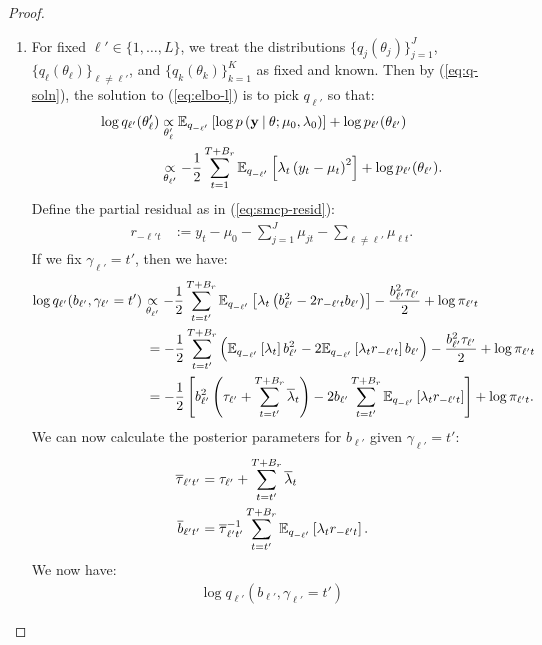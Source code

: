 \begin{proof}
\begin{enumerate}[label=\roman*.]
\item For fixed $\ell' \in\{1,\ldots,L\}$, we treat the distributions $\{q_j(\theta_j)\}_{j=1}^J$, $\{q_\ell(\theta_\ell)\}_{\ell\neq\ell'}$, and $\{q_k(\theta_k)\}_{k=1}^K$ as fixed and known. Then by (\ref{eq:q-soln}), the solution to (\ref{eq:elbo-l}) is to pick $q_{\ell'}$ so that:
\begin{align*}
    \log q_{\ell'}(\theta_\ell') &\underset{\theta_\ell'}{\propto} \mathbb{E}_{q_{-\ell'}} \left[\log p\left(\mathbf{y} \:|\: \theta;\mu_0,\lambda_0\right)\right] + \log p_{\ell'}(\theta_{\ell'}) \\
    &\underset{\theta_{\ell'}}{\propto} - \frac{1}{2}\sum_{t=1}^{T+B_r}  \mathbb{E}_{q_{-\ell'}}\left[\lambda_{t}\left(y_t - \mu_t\right)^2\right] + \log p_{\ell'}(\theta_{\ell'}).
\end{align*}
Define the partial residual as in (\ref{eq:smcp-resid}):
\begin{align*}
    r_{-\ell' t} &:= y_t - \mu_0 - \sum_{j=1}^J \mu_{jt} - \sum_{\ell \neq \ell'} \mu_{\ell t}.
\end{align*}
If we fix $\gamma_{\ell'} = t'$, then we have:
\begin{align*}
    \log q_{\ell'}(b_{\ell'},\gamma_{\ell'}=t') 
    &\underset{\theta_{\ell'}}{\propto}- \frac{1}{2}\sum_{t=t'}^{T+B_r}  \mathbb{E}_{q_{-\ell'}}\left[\lambda_{t}\left(b_{\ell'}^2 - 2r_{-\ell't}b_{\ell'} \right)\right] - \frac{b_{\ell'}^2\tau_{\ell'}}{2} + \log \pi_{\ell' t} \\
    &\;= - \frac{1}{2}\sum_{t=t'}^{T+B_r}  \left(\mathbb{E}_{q_{-\ell'}}\left[\lambda_{t}\right]b_{\ell'}^2 - 2\mathbb{E}_{q_{-\ell'}}\left[\lambda_{t}r_{-\ell't}\right]b_{\ell'}\right) - \frac{b_{\ell'}^2\tau_{\ell'}}{2} + \log \pi_{\ell' t}\\
    &\;= -\frac{1}{2}\left[b_{\ell'}^2\left(\tau_{\ell'} +\sum_{t=t'}^{T+B_r} \overline{\lambda}_t\right) - 2 b_{\ell'}\sum_{t=t'}^{T+B_r}\mathbb{E}_{q_{-\ell'}}\left[\lambda_{t}r_{-\ell't}\right]\right]  + \log \pi_{\ell' t}.
\end{align*}
We can now calculate the posterior parameters for $b_{\ell'}$ given $\gamma_{\ell'} = t'$:
\begin{align*}
    \overline{\tau}_{\ell't'} &= \tau_{\ell'} +\sum_{t=t'}^{T+B_r} \overline{\lambda}_t \\
    \overline{b}_{\ell't'} &= \overline{\tau}_{\ell't'}^{-1}  \sum_{t=t'}^{T+B_r} \mathbb{E}_{q_{-\ell'}}\left[\lambda_{t}r_{-\ell't}\right].
\end{align*}
We now have:
\begin{align*}
    \log q_{\ell'}(b_{\ell'},\gamma_{\ell'}=t') 

\end{align*}
\end{enumerate}
\end{proof}
